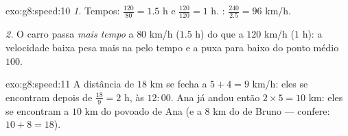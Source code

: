 \begin{solution}{exo:g8:speed:10}
\emph{1.} Tempos: $\frac{120}{80} = 1.5$ h e $\frac{120}{120} = 1$ h.
: $\frac{240}{2.5} = 96$ km/h.

\emph{2.} O carro passa \emph{mais tempo} a $80$ km/h ($1.5$ h) do que
a $120$ km/h ($1$ h): a velocidade baixa pesa mais na 
pelo tempo e a puxa para baixo do ponto médio $100$.
\end{solution}

\begin{solution}{exo:g8:speed:11}
A distância de $18$ km se fecha a $5 + 4 = 9$ km/h: eles se encontram
depois de $\frac{18}{9} = 2$ h, às $12{:}00$. Ana já andou então
$2 \times 5 = 10$ km: eles se encontram a $10$ km do povoado de Ana (e
a $8$ km do de Bruno --- confere: $10 + 8 = 18$).
\end{solution}

